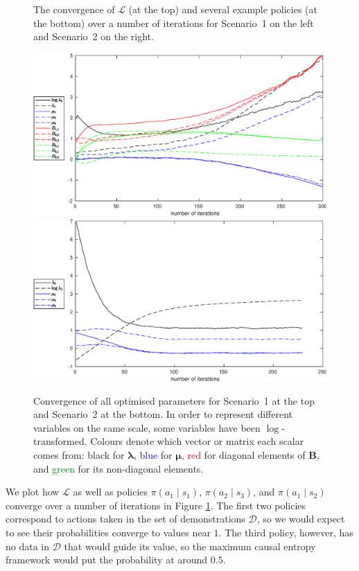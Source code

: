 \documentclass{mpaper}
\begin{document}
\begin{figure}
\begin{minipage}{.5\textwidth}
  \end{minipage}
  \caption{The convergence of $\mathcal{L}$ (at the top) and several example
    policies (at the bottom) over a number of iterations for Scenario~1 on the
    left and Scenario~2 on the right.}
  \label{fig:convergence1}
\end{figure}

\begin{figure}
  \centering
  \includegraphics[width=\textwidth]{parameter_convergence1}
  \includegraphics[width=\textwidth]{parameter_convergence2}
  \caption{Convergence of all optimised parameters for Scenario~1 at the top and
  Scenario~2 at the bottom. In order to represent different variables on the
  same scale, some variables have been $\log$-transformed. Colours denote which
  vector or matrix each scalar comes from: black for $\bm\lambda$,
  \textcolor{blue}{blue} for $\bm\mu$, \textcolor{red}{red} for diagonal
  elements of $\mathbf{B}$, and \textcolor{green}{green} for its non-diagonal
  elements.}
  \label{fig:convergence2}
\end{figure}

We plot how $\mathcal{L}$ as well as policies $\pi(a_1 \mid s_1)$, $\pi(a_2 \mid
s_3)$, and $\pi(a_1 \mid s_2)$ converge over a number of iterations in Figure
\ref{fig:convergence1}. The first two policies correspond to actions taken in
the set of demonstrations $\mathcal{D}$, so we would expect to see their
probabilities converge to values near $1$. The third policy, however, has no
data in $\mathcal{D}$ that would guide its value, so the maximum causal entropy
framework would put the probability at around $0.5$.
\end{document}
